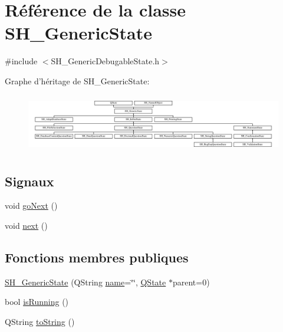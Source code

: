 \hypertarget{classSH__GenericState}{\section{Référence de la classe S\-H\-\_\-\-Generic\-State}
\label{classSH__GenericState}
}


{\ttfamily \#include $<$S\-H\-\_\-\-Generic\-Debugable\-State.\-h$>$}

Graphe d'héritage de S\-H\-\_\-\-Generic\-State\-:\begin{figure}[H]
\begin{center}
\leavevmode
\includegraphics[height=2.568807cm]{classSH__GenericState}
\end{center}
\end{figure}
\subsection*{Signaux}
\begin{DoxyCompactItemize}
\item 
void \hyperlink{classSH__GenericState_a34c1bebc765cc3a62d66c94c37d4f0c3}{go\-Next} ()
\item 
void \hyperlink{classSH__GenericState_ad5e2a1f3dc129336c8f529cf897c2eb0}{next} ()
\end{DoxyCompactItemize}
\subsection*{Fonctions membres publiques}
\begin{DoxyCompactItemize}
\item 
\hyperlink{classSH__GenericState_a3cc3cb1491b812dfdd032fc6438dfd4e}{S\-H\-\_\-\-Generic\-State} (Q\-String \hyperlink{classSH__NamedObject_a9f686c6f2a5bcc08ad03d0cee0151f0f}{name}=\char`\"{}\char`\"{}, \hyperlink{classQState}{Q\-State} $\ast$parent=0)
\item 
bool \hyperlink{classSH__GenericState_a5f731810dad0cacd28828ccbf1539e4e}{is\-Running} ()
\item 
Q\-String \hyperlink{classSH__GenericState_a7779babbb40f3f8faa71112204d9804f}{to\-String} ()
\end{DoxyCompactItemize}
